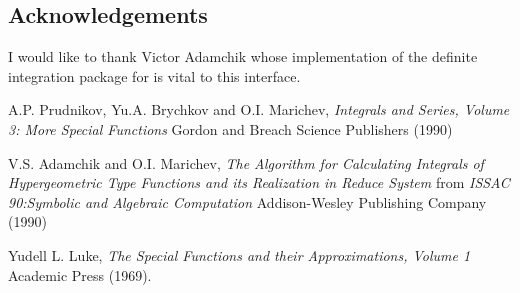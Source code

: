 \subsection{Acknowledgements}
I would like to thank Victor Adamchik whose implementation of the 
definite integration package for {\REDUCE} is vital to this
interface.  


\begin{thebibliography}{}

 A.P. Prudnikov, Yu.A. Brychkov and O.I. Marichev,
{\em Integrals and Series, Volume 3: More Special Functions} Gordon 
and Breach Science Publishers (1990)

 V.S. Adamchik and O.I. Marichev, {\em The 
Algorithm for Calculating Integrals of Hypergeometric Type Functions 
and its Realization in Reduce System} from {\em ISSAC 90:Symbolic and 
Algebraic Computation} Addison-Wesley Publishing Company (1990) 

 Yudell L. Luke, {\em The Special Functions and their
Approximations, Volume 1} Academic Press (1969).

\end{thebibliography}

